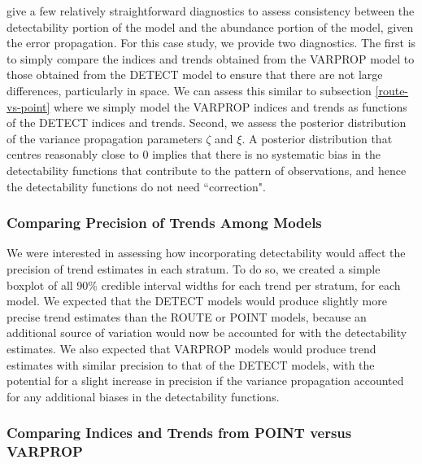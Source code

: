 \documentclass[12pt]{article}
\begin{document}
\par \citet{bravington_variance_2021} give a few relatively straightforward diagnostics to assess consistency between the detectability portion of the model and the abundance portion of the model, given the error propagation.
For this case study, we provide two diagnostics.
The first is to simply compare the indices and trends obtained from the VARPROP model to those obtained from the DETECT model to ensure that there are not large differences, particularly in space. 
We can assess this similar to subsection \ref{route-vs-point} where we simply model the VARPROP indices and trends as functions of the DETECT indices and trends.
Second, we assess the posterior distribution of the variance propagation parameters $\zeta$ and $\xi$.
A posterior distribution that centres reasonably close to 0 implies that there is no systematic bias in the detectability functions that contribute to the pattern of observations, and hence the detectability functions do not need ``correction".

\subsubsection{Comparing Precision of Trends Among Models}

\par We were interested in assessing how incorporating detectability would affect the precision of trend estimates in each stratum.
To do so, we created a simple boxplot of all 90\% credible interval widths for each trend per stratum, for each model.
We expected that the DETECT models would produce slightly more precise trend estimates than the ROUTE or POINT models, because an additional source of variation would now be accounted for with the detectability estimates.
We also expected that VARPROP models would produce trend estimates with similar precision to that of the DETECT models, with the potential for a slight increase in precision if the variance propagation accounted for any additional biases in the detectability functions.

\subsubsection{Comparing Indices and Trends from POINT versus VARPROP}
\end{document}
